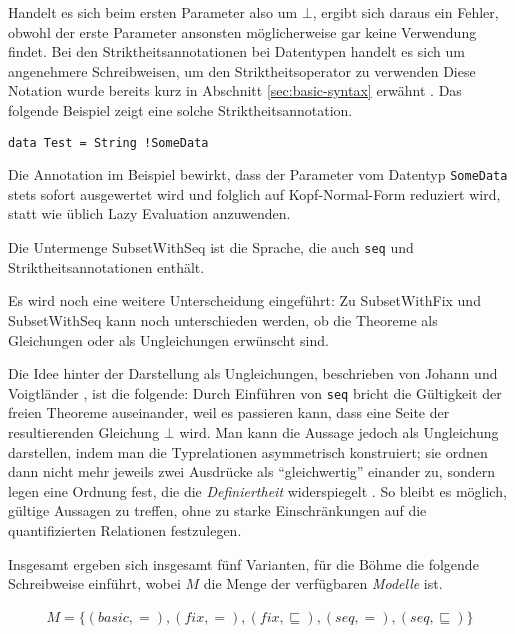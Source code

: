 Handelt es sich beim ersten Parameter also um $\bot$, ergibt sich daraus ein Fehler, obwohl der erste Parameter
ansonsten möglicherweise gar keine Verwendung findet. Bei den Striktheitsannotationen bei Datentypen handelt es sich
um angenehmere Schreibweisen, um den Striktheitsoperator zu verwenden 
Diese Notation wurde bereits kurz in Abschnitt \ref{sec:basic-syntax} erwähnt .
Das folgende Beispiel zeigt eine solche Striktheitsannotation.

\begin{verbatim}
data Test = String !SomeData
\end{verbatim}

Die Annotation im Beispiel bewirkt, dass der Parameter vom Datentyp \texttt{SomeData} stets sofort ausgewertet wird und
folglich auf Kopf-Normal-Form reduziert wird, statt wie üblich Lazy Evaluation anzuwenden.
 

Die Untermenge SubsetWithSeq ist die Sprache, die auch \texttt{seq} und Striktheitsannotationen enthält.

Es wird noch eine weitere Unterscheidung eingeführt: Zu SubsetWithFix und SubsetWithSeq kann noch unterschieden werden,
ob die Theoreme als Gleichungen oder als Ungleichungen erwünscht sind.

Die Idee hinter der Darstellung als Ungleichungen, beschrieben von Johann und Voigtländer \cite{johann}, ist die folgende: Durch Einführen von \texttt{seq} bricht die Gültigkeit der
freien Theoreme auseinander, weil es passieren kann, dass eine Seite der resultierenden Gleichung $\bot$ wird.
Man kann die Aussage jedoch als Ungleichung darstellen, indem man die Typrelationen asymmetrisch konstruiert; sie
ordnen dann nicht mehr jeweils zwei Ausdrücke als ``gleichwertig'' einander zu, sondern legen eine Ordnung fest, die
die \textit{Definiertheit} widerspiegelt \cite{johann}. So bleibt es möglich, gültige Aussagen zu treffen, ohne zu starke
Einschränkungen auf die quantifizierten Relationen festzulegen.

Insgesamt ergeben sich insgesamt fünf Varianten, für die Böhme \cite{freetheorems} die folgende Schreibweise einführt,
wobei $M$ die Menge der verfügbaren \textit{Modelle} ist.

\begin{align}
M = \{(basic, =), (fix, =), (fix, \sqsubseteq), (seq, =), (seq, \sqsubseteq)\}
\end{align}

